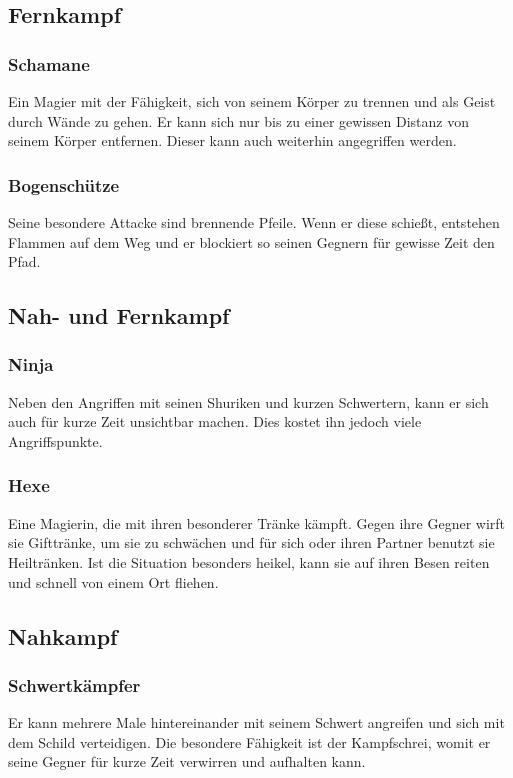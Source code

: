 \documentclass[10pt,a4paper,notitlepage]{report}
\begin{document}
\begin{flushleft}
\subsection{Fernkampf}
\subsubsection{Schamane}
Ein Magier mit der Fähigkeit, sich von seinem Körper zu trennen und als Geist durch Wände zu gehen. Er kann sich nur bis zu einer gewissen Distanz von seinem Körper entfernen. Dieser kann auch weiterhin angegriffen werden.\\
\subsubsection{Bogenschütze}
Seine besondere Attacke sind brennende Pfeile. Wenn er diese schießt, entstehen Flammen auf dem Weg und er blockiert so seinen Gegnern für gewisse Zeit den Pfad.\\
\subsection{Nah- und Fernkampf}
\subsubsection{Ninja}
Neben den Angriffen mit seinen Shuriken und kurzen Schwertern, kann er sich auch für kurze Zeit unsichtbar machen. Dies kostet ihn jedoch viele Angriffspunkte.\\
\subsubsection{Hexe}
Eine Magierin, die mit ihren besonderer Tränke kämpft. Gegen ihre Gegner wirft sie Gifttränke, um sie zu schwächen und für sich oder ihren Partner benutzt sie Heiltränken. Ist die Situation besonders heikel, kann sie auf ihren Besen reiten und schnell von einem Ort fliehen.\\
\subsection{Nahkampf}
\subsubsection{Schwertkämpfer}
Er kann mehrere Male hintereinander mit seinem Schwert angreifen und sich mit dem Schild verteidigen. Die besondere Fähigkeit ist der Kampfschrei, womit er seine Gegner für kurze Zeit verwirren und aufhalten kann.\\

\end{flushleft}
\end{document}
